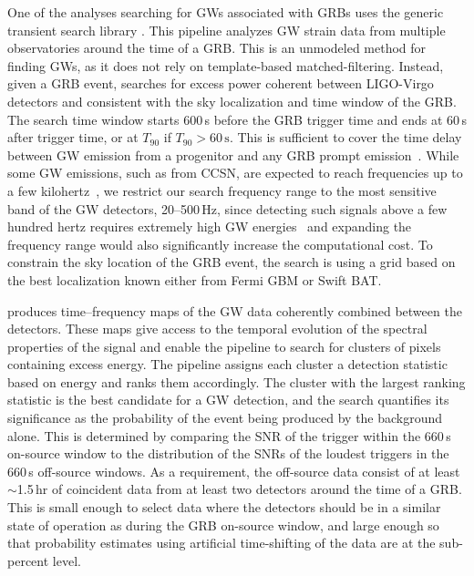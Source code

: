 One of the analyses searching for \acp{GW} associated with \acp{GRB} uses the generic transient search library \xpip.
This pipeline analyzes \ac{GW} strain data from multiple observatories around the time of a \ac{GRB}.
This is an unmodeled method for finding \acp{GW}, as it does not rely on template-based matched-filtering.
Instead, given a \ac{GRB} event, \xpip searches for excess power coherent between LIGO-Virgo detectors and consistent with the sky localization and time window of the \ac{GRB}.
The search time window starts 600\,s before the GRB trigger time and ends at 60\,s after trigger time, or at $T_{90}$ if $T_{90} > 60\,\text{s}$.
This is sufficient to cover the time delay between GW emission from a progenitor and any GRB prompt emission~\citep{Koshut_1995, Aloy_2000, MacFadyen_2001, Zhang_2003, Lazzati_2005, Wang_2007, Burlon_2008, Burlon_2009, Lazzati_2009, Vedrenne_2009}.
While some GW emissions, such as from \ac{CCSN}, are expected to reach frequencies up to a few kilohertz~\citep{Radice_2019}, we restrict our search frequency range to the most sensitive band of the GW detectors, 20–500\,Hz, since detecting such signals above a few hundred hertz requires extremely high GW energies~\citep{burst_o2} and expanding the frequency range would also significantly increase the computational cost. To constrain the sky location of the GRB event, the search is using a grid based on the best localization known either from Fermi \ac{GBM} or Swift \ac{BAT}.

\xpip produces time–frequency maps of the \ac{GW} data coherently combined between the detectors.
These maps give access to the temporal evolution of the spectral properties of the signal and enable the pipeline to search for clusters of pixels containing excess energy.
The pipeline assigns each cluster a detection statistic based on energy and ranks them accordingly.
The cluster with the largest ranking statistic is the best candidate for a GW detection, and the search quantifies its significance as the probability of the event being produced by the background alone.
This is determined by comparing the \ac{SNR} of the trigger within the 660\,s on-source window to the distribution of the \acp{SNR} of the loudest triggers in the 660\,s off-source windows.
As a requirement, the off-source data consist of at least $\sim$1.5\,hr of coincident data from at least two detectors around the time of a \ac{GRB}.
This is small enough to select data where the detectors should be in a similar state of operation as during the \ac{GRB} on-source window, and large enough so that probability estimates using artificial time-shifting of the data are at the sub-percent level.

